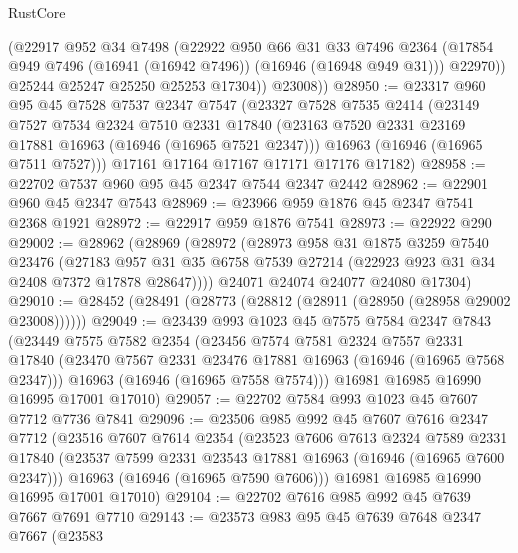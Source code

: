 \begin{lexlean}{RustCore}
\begin{coremodule}
            (@22917
              @952
              @34
              @7498
              (@22922
                @950
                @66
                @31
                @33
                @7496
                @2364
                (@17854 @949 @7496 (@16941 (@16942 @7496)) (@16946 (@16948 @949 @31)))
                @22970))
            @25244
            @25247
            @25250
            @25253
            @17304))
        @23008))
@28950 := @23317
    @960
    @95
    @45
    @7528
    @7537
    @2347
    @7547
    (@23327
      @7528
      @7535
      @2414
      (@23149
        @7527
        @7534
        @2324
        @7510
        @2331
        @17840
        (@23163 @7520 @2331 @23169 @17881 @16963 (@16946 (@16965 @7521 @2347)))
        @16963
        (@16946 (@16965 @7511 @7527)))
      @17161
      @17164
      @17167
      @17171
      @17176
      @17182)
@28958 := @22702 @7537 @960 @95 @45 @2347 @7544 @2347 @2442
@28962 := @22901 @960 @45 @2347 @7543
@28969 := @23966 @959 @1876 @45 @2347 @7541 @2368 @1921
@28972 := @22917 @959 @1876 @7541
@28973 := @22922 @290
@29002 := @28962
    (@28969
      (@28972
        (@28973
          @958
          @31
          @1875
          @3259
          @7540
          @23476
          (@27183 @957 @31 @35 @6758 @7539 @27214 (@22923 @923 @31 @34 @2408 @7372 @17878 @28647))))
      @24071
      @24074
      @24077
      @24080
      @17304)
@29010 := @28452 (@28491 (@28773 (@28812 (@28911 (@28950 (@28958 @29002 @23008))))))
@29049 := @23439
    @993
    @1023
    @45
    @7575
    @7584
    @2347
    @7843
    (@23449
      @7575
      @7582
      @2354
      (@23456
        @7574
        @7581
        @2324
        @7557
        @2331
        @17840
        (@23470 @7567 @2331 @23476 @17881 @16963 (@16946 (@16965 @7568 @2347)))
        @16963
        (@16946 (@16965 @7558 @7574)))
      @16981
      @16985
      @16990
      @16995
      @17001
      @17010)
@29057 := @22702 @7584 @993 @1023 @45 @7607 @7712 @7736 @7841
@29096 := @23506
    @985
    @992
    @45
    @7607
    @7616
    @2347
    @7712
    (@23516
      @7607
      @7614
      @2354
      (@23523
        @7606
        @7613
        @2324
        @7589
        @2331
        @17840
        (@23537 @7599 @2331 @23543 @17881 @16963 (@16946 (@16965 @7600 @2347)))
        @16963
        (@16946 (@16965 @7590 @7606)))
      @16981
      @16985
      @16990
      @16995
      @17001
      @17010)
@29104 := @22702 @7616 @985 @992 @45 @7639 @7667 @7691 @7710
@29143 := @23573
    @983
    @95
    @45
    @7639
    @7648
    @2347
    @7667
    (@23583

\end{coremodule}
\end{lexlean}
